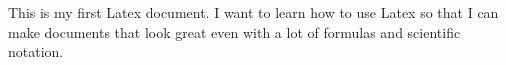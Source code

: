 \documentclass{article}
\begin{document}
This is my first Latex document. I want to learn how to use Latex so that I can make documents that look great even with a lot of formulas and scientific notation.
\end{document}
